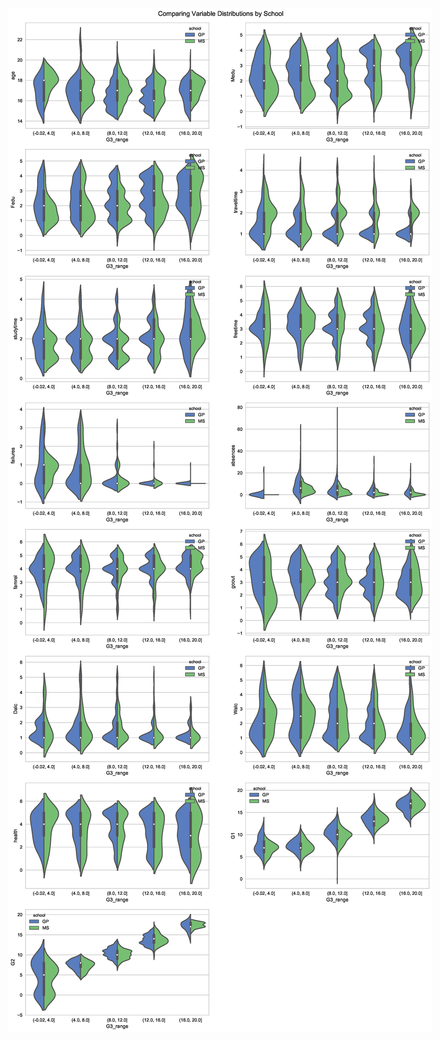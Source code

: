 \documentclass[12pt]{article}
\begin{document}
\begin{figure}[H]
\centering
\includegraphics[width=\textwidth,height=0.8\textheight,keepaspectratio]{figures/distrbyschool.eps}
\end{figure}
\end{document}
